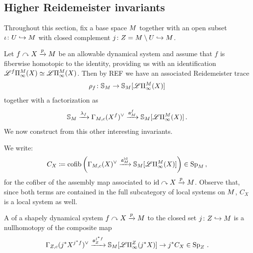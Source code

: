 \subsection{Higher Reidemeister invariants}
Throughout this section, fix a base space $M$ together with an
open subset $\iota \colon U \hookrightarrow M$ 
with closed complement $j\colon Z = M \setminus U \hookrightarrow M$. 

Let $f\curvearrowright X \xrightarrow{p} M$ be an allowable
dynamical system and assume that $f$ is fiberwise homotopic to the identity, providing us with an identification $\cL^{f}\ani{X}[\base]\simeq \cL\ani{X}[\base]$.
Then by REF we have an associated Reidemeister trace
\[ \rho_{f}\colon \SS_{\base} \to \SS_{\base}[\cL\ani{X}[\base]]\]
together with a factorization as
\[ \SS_{\base} \xrightarrow{\lambda_f} \pbmsec{X^f}{\base} 
\xrightarrow{\ass^f_{\base}} \SS_{\base}[\cL\ani{X}[\base]]\,.\]
We now construct from this other interesting invariants.

We write:
\[ C_X \coloneq \cofib\left(\pbmsec{X}{\base}
\xrightarrow{\ass^{\id}_{\base}} \SS_{\base}[\cL \ani{X}[\base]]\right)\in \D{\base}\,,\]
for the cofiber of the assembly map associated to 
$\operatorname{id} \curvearrowright X \xrightarrow{p} M$.
Observe that, since both terms are contained in the full
subcategory of local systems on $M$, $C_{X}$ is a local
system as well.

\begin{defn}
A  of a shapely dynamical system 
$f\curvearrowright X \xrightarrow{p} M$
to the closed set $j \colon Z \hookrightarrow M$ is a 
nullhomotopy of the composite map
    \[ \pbmsec{j^*X^{j^*f}}{\closed} \xrightarrow{\ass_{\closed}^{j^*f}} \SS_{\base}[\cL\ani{j^*X}[\closed]] \to j^*C_X \in \pSp{\closed}\,.\]
\end{defn}

